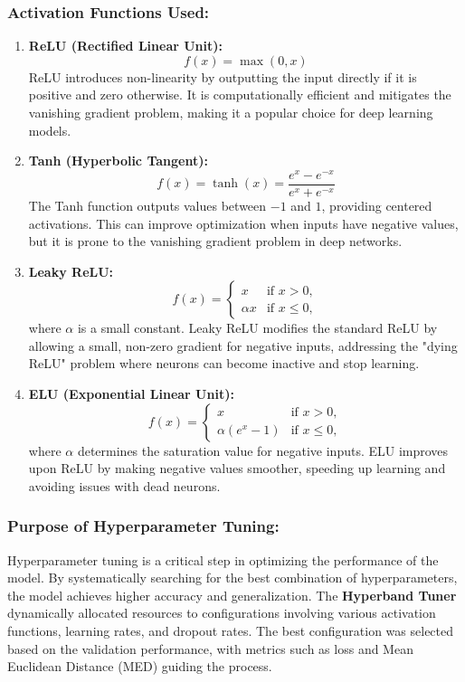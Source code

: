 \subsubsection{Activation Functions Used:}
\begin{enumerate}
    \item \textbf{ReLU (Rectified Linear Unit):}
    \[
    f(x) = \max(0, x)
    \]
    ReLU introduces non-linearity by outputting the input directly if it is positive and zero otherwise. It is computationally efficient and mitigates the vanishing gradient problem, making it a popular choice for deep learning models.

    \item \textbf{Tanh (Hyperbolic Tangent):}
    \[
    f(x) = \tanh(x) = \frac{e^x - e^{-x}}{e^x + e^{-x}}
    \]
    The Tanh function outputs values between \(-1\) and \(1\), providing centered activations. This can improve optimization when inputs have negative values, but it is prone to the vanishing gradient problem in deep networks.

    \item \textbf{Leaky ReLU:}
    \[
    f(x) = 
    \begin{cases} 
    x & \text{if } x > 0, \\ 
    \alpha x & \text{if } x \leq 0,
    \end{cases}
    \]
    where \(\alpha\) is a small constant. Leaky ReLU modifies the standard ReLU by allowing a small, non-zero gradient for negative inputs, addressing the "dying ReLU" problem where neurons can become inactive and stop learning.

    \item \textbf{ELU (Exponential Linear Unit):}
    \[
    f(x) = 
    \begin{cases} 
    x & \text{if } x > 0, \\ 
    \alpha (e^x - 1) & \text{if } x \leq 0,
    \end{cases}
    \]
    where \(\alpha\) determines the saturation value for negative inputs. ELU improves upon ReLU by making negative values smoother, speeding up learning and avoiding issues with dead neurons.
\end{enumerate}

\subsubsection{Purpose of Hyperparameter Tuning:}
Hyperparameter tuning is a critical step in optimizing the performance of the model. By systematically searching for the best combination of hyperparameters, the model achieves higher accuracy and generalization. The \textbf{Hyperband Tuner} dynamically allocated resources to configurations involving various activation functions, learning rates, and dropout rates. The best configuration was selected based on the validation performance, with metrics such as loss and Mean Euclidean Distance (MED) guiding the process.

